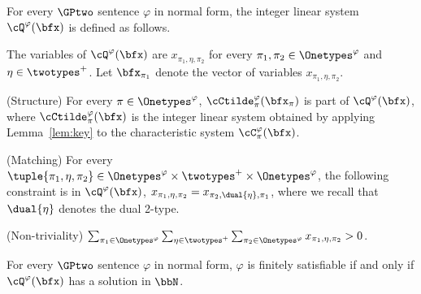 \begin{definition}
\label{def:linear-system-Q}
    For every $\GPtwo$ sentence $\varphi$ in normal form,
    the integer linear system $\cQ^\varphi(\bfx)$ is defined as follows.
    \begin{compactitem}
        \item The variables of $\cQ^\varphi(\bfx)$ are $x_{\pi_1, \eta, \pi_2}$
        for every $\pi_1, \pi_2 \in \Onetypes^\varphi$ and $\eta \in \twotypes^+$.
        Let $\bfx_{\pi_1}$ denote the vector of variables $x_{\pi_1, \eta, \pi_2}$.
        
        \item (Structure)
        For every $\pi \in \Onetypes^\varphi$,
        $\cCtilde^\varphi_\pi(\bfx_\pi)$
        is part of $\cQ^\varphi(\bfx)$,
        where $\cCtilde^\varphi_\pi(\bfx)$ is the integer linear system obtained by applying Lemma~\ref{lem:key} to the characteristic system $\cC^\varphi_\pi(\bfx)$.
            
        \item (Matching)
        For every $\tuple{\pi_1, \eta, \pi_2} \in \Onetypes^\varphi \times \twotypes^+ \times \Onetypes^\varphi$,
        the following constraint is in $\cQ^\varphi(\bfx)$,
        $x_{\pi_1, \eta, \pi_2} = x_{\pi_2, \dual{\eta}, \pi_1}$,
        where we recall that $\dual{\eta}$ denotes the dual 2-type.

        \item (Non-triviality)
            $\sum_{\pi_1 \in \Onetypes^\varphi}
            \sum_{\eta \in \twotypes^+}
            \sum_{\pi_2 \in \Onetypes^\varphi} x_{\pi_1, \eta, \pi_2}
             > 0$.
    \end{compactitem}
\end{definition}


\begin{lemma}\label{lem:equiv2}
    For every $\GPtwo$ sentence $\varphi$ in normal form,
    $\varphi$ is finitely satisfiable if and only if
    $\cQ^\varphi(\bfx)$ has a solution in $\bbN$.
\end{lemma}

